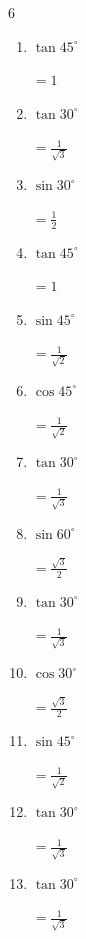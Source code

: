 \begin{multicols}{6}
\begin{enumerate}
  \item $\displaystyle \tan{45^\circ}$

        $\displaystyle =1$

  \item $\displaystyle \tan{30^\circ}$

        $\displaystyle =\frac{1}{\sqrt{3}}$

  \item $\displaystyle \sin{30^\circ}$

        $\displaystyle =\frac{1}{2}$

  \item $\displaystyle \tan{45^\circ}$

        $\displaystyle =1$

  \item $\displaystyle \sin{45^\circ}$

        $\displaystyle =\frac{1}{\sqrt{2}}$

  \item $\displaystyle \cos{45^\circ}$

        $\displaystyle =\frac{1}{\sqrt{2}}$

  \item $\displaystyle \tan{30^\circ}$

        $\displaystyle =\frac{1}{\sqrt{3}}$

\columnbreak %

  \item $\displaystyle \sin{60^\circ}$

        $\displaystyle =\frac{\sqrt{3}}{2}$

  \item $\displaystyle \tan{30^\circ}$

        $\displaystyle =\frac{1}{\sqrt{3}}$

  \item $\displaystyle \cos{30^\circ}$

        $\displaystyle =\frac{\sqrt{3}}{2}$

  \item $\displaystyle \sin{45^\circ}$

        $\displaystyle =\frac{1}{\sqrt{2}}$

  \item $\displaystyle \tan{30^\circ}$

        $\displaystyle =\frac{1}{\sqrt{3}}$

  \item $\displaystyle \tan{30^\circ}$

        $\displaystyle =\frac{1}{\sqrt{3}}$


\end{enumerate}
\end{multicols}
